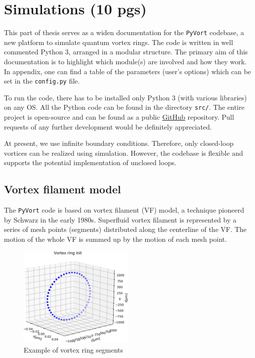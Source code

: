 \chapter{Simulations (10 pgs)}

This part of thesis serves as a widen documentation for the \texttt{PyVort} codebase, a new platform to simulate quantum vortex rings. The code is written in well commented Python 3, arranged in a modular structure. The primary aim of this documentation is to highlight which module(s) are involved and how they work.
In appendix, one can find a table of the parameters (user's options) which can be set in the \texttt{config.py} file.

To run the code, there has to be installed only Python 3 (with various libraries) on any OS. All the Python code can be found in the directory \texttt{src/}. The entire project is open-source and can be found as a public \href{https://github.com/KuboBahyl/superfluid}{GitHub} repository. Pull requests of any further development would be definitely appreciated.

At present, we use infinite boundary conditions. Therefore, only closed-loop vortices can be realized using simulation. However, the codebase is flexible and supports the potential implementation of unclosed loops.

\section{Vortex filament model}

The \texttt{PyVort} code is based on vortex filament (VF) model, a technique pioneerd by Schwarz in the early 1980s. Superfluid vortex filament is represented by a series of mesh points (segments) distributed along the centerline of the VF. The motion of the whole VF is summed up by the motion of each mesh point.

\begin{figure}[h]
	\centering
	\includegraphics[width=0.5\textwidth]{graphics/simul/ring_init_crop}
	\caption{Example of vortex ring segments}
\end{figure}

